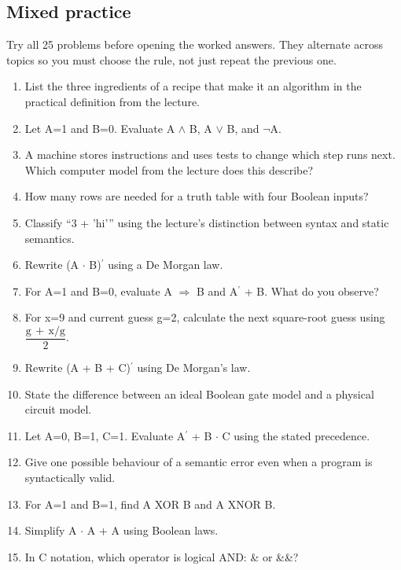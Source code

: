 \documentclass[11pt]{article}
\begin{document}
\begin{keepsection}
\section{Mixed practice}

Try all 25 problems before opening the worked answers. They alternate across topics so you must choose the rule, not just repeat the previous one.

\begin{enumerate}
\item List the three ingredients of a recipe that make it an algorithm in the practical definition from the lecture.
\item Let A=1 and B=0. Evaluate A \ensuremath{\land} B, A \ensuremath{\lor} B, and \ensuremath{\neg}A.
\item A machine stores instructions and uses tests to change which step runs next. Which computer model from the lecture does this describe?
\item How many rows are needed for a truth table with four Boolean inputs?
\item Classify “3 + 'hi'” using the lecture's distinction between syntax and static semantics.
\item Rewrite (A \ensuremath{\cdot} B)\ensuremath{{}^{\prime}} using a De Morgan law.
\item For A=1 and B=0, evaluate A \ensuremath{\Rightarrow} B and A\ensuremath{{}^{\prime}} + B. What do you observe?
\item For x=9 and current guess g=2, calculate the next square-root guess using {\small\ensuremath{\dfrac{\mathrm{g}\, +\, \mathrm{x}/\mathrm{g}}{2}}}.
\item Rewrite (A + B + C)\ensuremath{{}^{\prime}} using De Morgan's law.
\item State the difference between an ideal Boolean gate model and a physical circuit model.
\item Let A=0, B=1, C=1. Evaluate A\ensuremath{{}^{\prime}} + B \ensuremath{\cdot} C using the stated precedence.
\item Give one possible behaviour of a semantic error even when a program is syntactically valid.
\item For A=1 and B=1, find A XOR B and A XNOR B.
\item Simplify A \ensuremath{\cdot} A + A using Boolean laws.
\item In C notation, which operator is logical AND: \& or \&\&?

\end{enumerate}
\end{keepsection}
\end{document}

